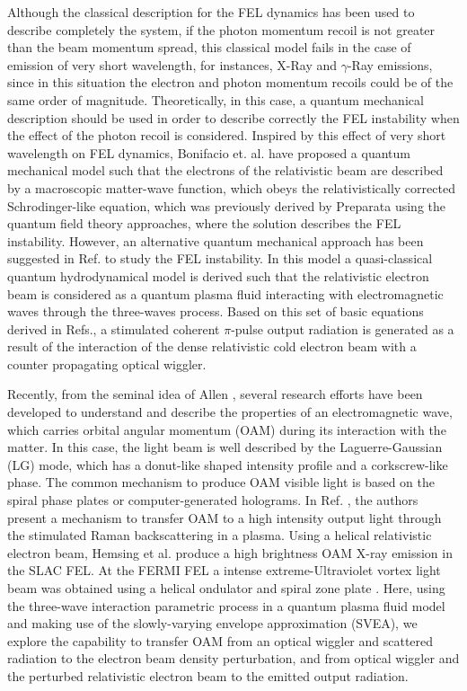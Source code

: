 \documentclass[aps,pra,preprint,showpacs,preprintnumbers,amsmath,amssymb]{revtex4-1}
\begin{document}
 Although the classical description for the FEL dynamics has been used to describe completely the system, if the photon momentum recoil is not greater than the beam momentum spread, this classical model fails in the case of emission of very short wavelength, for instances, X-Ray and $\gamma$-Ray emissions, since in this situation the electron and photon momentum recoils could be of the same
order of magnitude. Theoretically, in this case, a quantum mechanical description should be used in order to describe correctly the FEL instability when the effect of the photon recoil is considered. Inspired by this effect of very short wavelength on FEL dynamics, Bonifacio et. al.\cite{Boni2005} have proposed a quantum mechanical model such that the electrons of the relativistic beam are described by a macroscopic matter-wave function, which obeys the relativistically corrected Schrodinger-like equation, which was previously derived by Preparata\cite{preparata} using the quantum field theory approaches, where the solution describes the FEL instability. However, an alternative quantum mechanical approach has been suggested in Ref.\cite{serbetoqfel, lfmonteiro} to study the FEL instability. In this model a quasi-classical quantum hydrodynamical model is derived such that the relativistic electron beam is considered as a quantum plasma fluid interacting with electromagnetic waves through the three-waves process. Based on this set of basic equations derived in Refs.\cite{lfmonteiro, serbetoqfel, guarumo}, a stimulated coherent $\pi$-pulse output radiation is generated as a result of the interaction of the dense relativistic cold electron beam with a counter propagating optical wiggler. 

Recently, from the seminal idea of Allen \cite{allen}, several research efforts have been developed to understand and describe the properties of an electromagnetic wave, which carries orbital angular momentum (OAM) during its interaction with the matter. In this case, the light beam is well described by the Laguerre-Gaussian (LG) mode, which has a donut-like shaped intensity profile and a corkscrew-like phase. The common mechanism to produce OAM visible light is based on the spiral phase plates or computer-generated holograms. In Ref. \cite{titonature}, the authors  present a mechanism to transfer OAM to a high intensity output light through the stimulated Raman backscattering in a plasma. Using a helical relativistic electron beam, Hemsing et al. \cite{hemsingnature} produce a high brightness OAM X-ray emission in the SLAC FEL. At the FERMI FEL a intense  extreme-Ultraviolet vortex light beam was obtained  using a helical ondulator  and spiral zone plate \cite{felvortex}. Here,
using the three-wave interaction parametric process in a quantum plasma fluid model and making use of the slowly-varying envelope approximation (SVEA), we explore the capability to transfer OAM from an optical wiggler and scattered radiation to the electron beam density perturbation, and from optical wiggler and the perturbed relativistic electron beam to the emitted output radiation.
\end{document}
